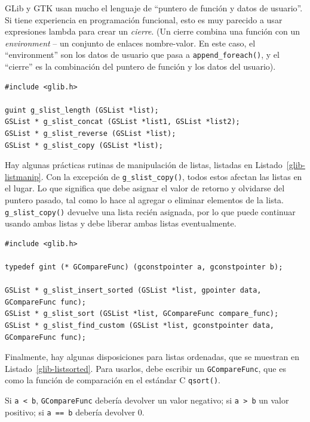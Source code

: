GLib y GTK usan mucho el lenguaje de ``puntero de función y datos de usuario''. Si tiene experiencia en programación funcional, esto es muy parecido a usar expresiones lambda para crear un \emph{cierre}. (Un cierre combina una función con un \emph{environment} -- un conjunto de enlaces nombre-valor. En este caso, el ``environment'' son los datos de usuario que pasa a \lstinline{append_foreach()}, y el ``cierre'' es la combinación del puntero de función y los datos del usuario).

\begin{lstlisting}[style=GLib/GTK, caption={Manipular una lista vinculada}, label=glib-listmanip]
#include <glib.h>

guint g_slist_length (GSList *list);
GSList * g_slist_concat (GSList *list1, GSList *list2);
GSList * g_slist_reverse (GSList *list);
GSList * g_slist_copy (GSList *list);
\end{lstlisting}

Hay algunas prácticas rutinas de manipulación de listas, listadas en Listado~\ref{glib-listmanip}. Con la excepción de \lstinline{g_slist_copy()}, todos estos afectan las listas en el lugar. Lo que significa que debe asignar el valor de retorno y olvidarse del puntero pasado, tal como lo hace al agregar o eliminar elementos de la lista. \lstinline{g_slist_copy()} devuelve una lista recién asignada, por lo que puede continuar usando ambas listas y debe liberar ambas listas eventualmente.

\begin{lstlisting}[style=GLib/GTK, caption={Listas ordenadas}, label=glib-listsorted]
#include <glib.h>

typedef gint (* GCompareFunc) (gconstpointer a, gconstpointer b);

GSList * g_slist_insert_sorted (GSList *list, gpointer data, GCompareFunc func);
GSList * g_slist_sort (GSList *list, GCompareFunc compare_func);
GSList * g_slist_find_custom (GSList *list, gconstpointer data, GCompareFunc func);
\end{lstlisting}

Finalmente, hay algunas disposiciones para listas ordenadas, que se muestran en Listado~\ref{glib-listsorted}. Para usarlos, debe escribir un \lstinline{GCompareFunc}, que es como la función de comparación en el estándar C \lstinline{qsort()}.

Si \lstinline{a < b}, \lstinline{GCompareFunc} debería devolver un valor negativo; si \lstinline{a > b} un valor positivo; si \lstinline{a == b} debería devolver 0.


